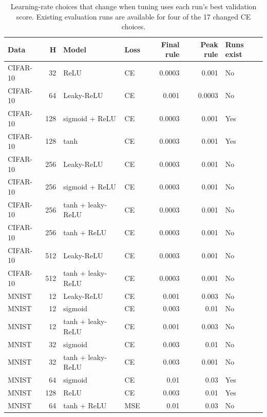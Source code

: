 \begin{table}[htbp]
\centering
\caption{Learning-rate choices that change when tuning uses each run's best validation score. Existing evaluation runs are available for four of the 17 changed CE choices.}
\label{tab:calchanges}
\footnotesize
\begin{tabular}{@{}lrllrrl@{}}
\toprule
Data & H & Model & Loss & Final rule & Peak rule & Runs exist \\
\midrule
CIFAR-10 & 32 & ReLU & CE & 0.0003 & 0.001 & No \\
CIFAR-10 & 64 & Leaky-ReLU & CE & 0.001 & 0.0003 & No \\
CIFAR-10 & 128 & sigmoid + ReLU & CE & 0.0003 & 0.001 & Yes \\
CIFAR-10 & 128 & tanh & CE & 0.0003 & 0.001 & Yes \\
CIFAR-10 & 256 & Leaky-ReLU & CE & 0.0003 & 0.001 & No \\
CIFAR-10 & 256 & sigmoid + ReLU & CE & 0.0003 & 0.001 & No \\
CIFAR-10 & 256 & tanh + leaky-ReLU & CE & 0.0003 & 0.001 & No \\
CIFAR-10 & 256 & tanh + ReLU & CE & 0.0003 & 0.001 & No \\
CIFAR-10 & 512 & Leaky-ReLU & CE & 0.0003 & 0.001 & No \\
CIFAR-10 & 512 & tanh + leaky-ReLU & CE & 0.0003 & 0.001 & No \\
MNIST & 12 & Leaky-ReLU & CE & 0.001 & 0.003 & No \\
MNIST & 12 & sigmoid & CE & 0.003 & 0.01 & No \\
MNIST & 12 & tanh + leaky-ReLU & CE & 0.001 & 0.003 & No \\
MNIST & 32 & sigmoid & CE & 0.003 & 0.01 & No \\
MNIST & 32 & tanh + leaky-ReLU & CE & 0.003 & 0.001 & No \\
MNIST & 64 & sigmoid & CE & 0.01 & 0.03 & Yes \\
MNIST & 128 & ReLU & CE & 0.003 & 0.01 & Yes \\
MNIST & 64 & tanh + ReLU & MSE & 0.01 & 0.03 & No \\
\bottomrule
\end{tabular}
\end{table}
